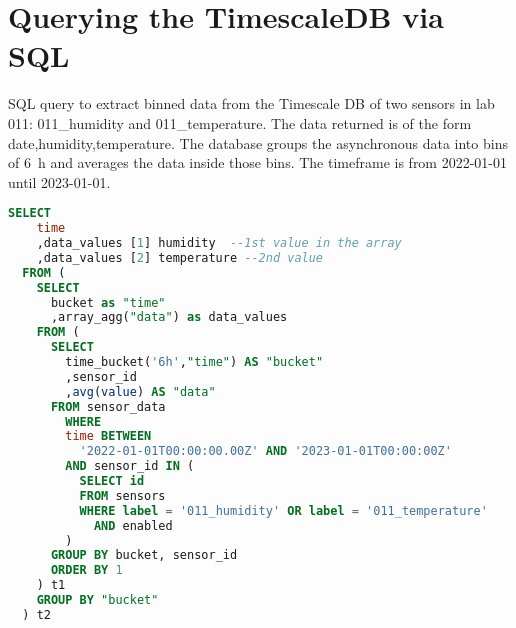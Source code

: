 \documentclass[12pt]{book}
\begin{document}
\section{Querying the TimescaleDB via SQL}
SQL query to extract binned data from the Timescale DB of two sensors in lab 011: \textsf{011\_humidity} and \textsf{011\_temperature}. The data returned is of the form \textsf{date,humidity,temperature}. The database groups the asynchronous data into bins of \qty{6}{\hour} and averages the data inside those bins. The timeframe is from 2022-01-01 until 2023-01-01.

\begin{lstlisting}[language=sql,title=SQL query]
  SELECT
    time
    ,data_values [1] humidity  --1st value in the array
    ,data_values [2] temperature --2nd value
  FROM (
    SELECT
      bucket as "time"
      ,array_agg("data") as data_values
    FROM (
      SELECT
        time_bucket('6h',"time") AS "bucket"
        ,sensor_id
        ,avg(value) AS "data"
      FROM sensor_data
        WHERE
        time BETWEEN
          '2022-01-01T00:00:00.00Z' AND '2023-01-01T00:00:00Z'
        AND sensor_id IN (
          SELECT id
          FROM sensors
          WHERE label = '011_humidity' OR label = '011_temperature'
            AND enabled
        )
      GROUP BY bucket, sensor_id
      ORDER BY 1
    ) t1
    GROUP BY "bucket"
  ) t2
\end{lstlisting}
\end{document}
